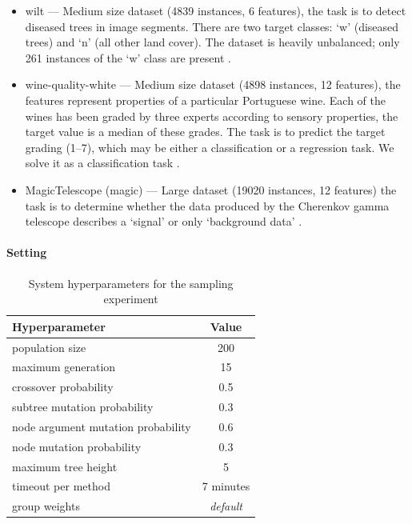 \begin{itemize}
\item wilt --- Medium size dataset (4839 instances, 6 features), the task is to
detect diseased trees in image segments. There are two target classes: `w' (diseased
trees) and `n' (all other land cover). The dataset is heavily unbalanced; only
261 instances of the `w' class are present
\citep{doi:10.1080/01431161.2013.810825}.
\item wine-quality-white --- Medium size dataset (4898 instances, 12 features),
the features represent properties of a particular Portuguese wine. Each of the
wines has been graded by three experts according to sensory properties, the
target value is a median of these grades. The task is to predict the target
grading (1--7), which may be either a classification or a regression task.
We solve it as a classification task \citep{CORTEZ2009547}.
\item MagicTelescope (magic) --- Large dataset (19020 instances, 12 features)
the task is to determine whether the data produced by the Cherenkov gamma
telescope describes a `signal' or only `background data' \citep{BOCK2004511}.
\end{itemize}

\paragraph{Setting}

\begin{table}[ht]

\centering
\caption{System hyperparameters for the sampling experiment}\label{tab04:exp1:setting}
\begin{tabular}{l c}
\toprule
\textbf{\upshape Hyperparameter} & \textbf{Value} \\
\midrule
population size & 200 \\
maximum generation & 15 \\
crossover probability & 0.5 \\
subtree mutation probability & 0.3 \\
node argument mutation probability & 0.6 \\
node mutation probability & 0.3 \\
maximum tree height & 5 \\
timeout per method  & 7 minutes \\
group weights & \textit{default} \\
\bottomrule

\end{tabular}

\end{table}

